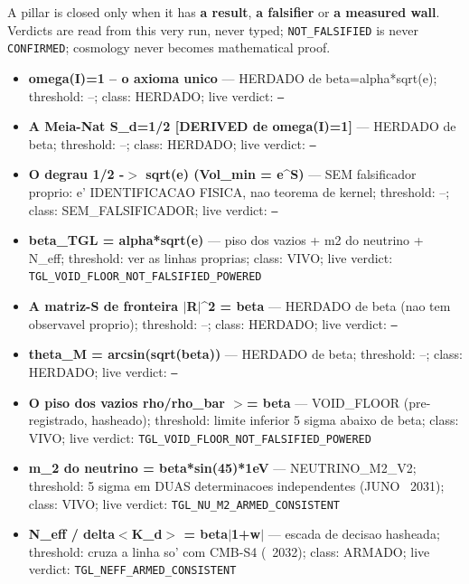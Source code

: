 \documentclass[11pt]{article}
\theoremstyle{definition}\newtheorem{deriv}{Derivation}
\begin{document}
A pillar is closed only when it has \textbf{a result}, \textbf{a falsifier} or \textbf{a measured wall}. Verdicts are read from this very run, never typed; \texttt{NOT\_FALSIFIED} is never \texttt{CONFIRMED}; cosmology never becomes mathematical proof.

\begin{itemize}

\item \textbf{omega(I)=1 -- o axioma unico} --- HERDADO de beta=alpha*sqrt(e); threshold: --; class: HERDADO; live verdict: \texttt{--}

\item \textbf{A Meia-Nat S\_d=1/2 [DERIVED de omega(I)=1]} --- HERDADO de beta; threshold: --; class: HERDADO; live verdict: \texttt{--}

\item \textbf{O degrau 1/2 -$>$ sqrt(e)  (Vol\_min = e\^{}S)} --- SEM falsificador proprio: e' IDENTIFICACAO FISICA, nao teorema de kernel; threshold: --; class: SEM\_FALSIFICADOR; live verdict: \texttt{--}

\item \textbf{beta\_TGL = alpha*sqrt(e)} --- piso dos vazios + m2 do neutrino + N\_eff; threshold: ver as linhas proprias; class: VIVO; live verdict: \texttt{TGL\_VOID\_FLOOR\_NOT\_FALSIFIED\_POWERED}

\item \textbf{A matriz-S de fronteira $|$R$|$\^{}2 = beta} --- HERDADO de beta (nao tem observavel proprio); threshold: --; class: HERDADO; live verdict: \texttt{--}

\item \textbf{theta\_M = arcsin(sqrt(beta))} --- HERDADO de beta; threshold: --; class: HERDADO; live verdict: \texttt{--}

\item \textbf{O piso dos vazios rho/rho\_bar $>$= beta} --- VOID\_FLOOR (pre-registrado, hasheado); threshold: limite inferior 5 sigma abaixo de beta; class: VIVO; live verdict: \texttt{TGL\_VOID\_FLOOR\_NOT\_FALSIFIED\_POWERED}

\item \textbf{m\_2 do neutrino = beta*sin(45)*1eV} --- NEUTRINO\_M2\_V2; threshold: 5 sigma em DUAS determinacoes independentes (JUNO ~2031); class: VIVO; live verdict: \texttt{TGL\_NU\_M2\_ARMED\_CONSISTENT}

\item \textbf{N\_eff / delta$<$K\_d$>$ = beta$|$1+w$|$} --- escada de decisao hasheada; threshold: cruza a linha so' com CMB-S4 (~2032); class: ARMADO; live verdict: \texttt{TGL\_NEFF\_ARMED\_CONSISTENT}


\end{itemize}
\end{document}
